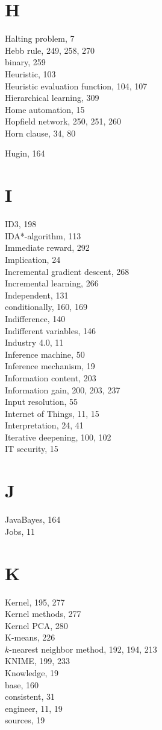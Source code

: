 \documentclass[10pt]{article}
\begin{document}
\section*{H}
Halting problem, 7\\
Hebb rule, 249, 258, 270\\
binary, 259\\
Heuristic, 103\\
Heuristic evaluation function, 104, 107\\
Hierarchical learning, 309\\
Home automation, 15\\
Hopfield network, 250, 251, 260\\
Horn clause, 34, 80

Hugin, 164

\section*{I}
ID3, 198\\
IDA*-algorithm, 113\\
Immediate reward, 292\\
Implication, 24\\
Incremental gradient descent, 268\\
Incremental learning, 266\\
Independent, 131\\
conditionally, 160, 169\\
Indifference, 140\\
Indifferent variables, 146\\
Industry 4.0, 11\\
Inference machine, 50\\
Inference mechanism, 19\\
Information content, 203\\
Information gain, 200, 203, 237\\
Input resolution, 55\\
Internet of Things, 11, 15\\
Interpretation, 24, 41\\
Iterative deepening, 100, 102\\
IT security, 15

\section*{J}
JavaBayes, 164\\
Jobs, 11

\section*{K}
Kernel, 195, 277\\
Kernel methods, 277\\
Kernel PCA, 280\\
K-means, 226\\
$k$-nearest neighbor method, 192, 194, 213\\
KNIME, 199, 233\\
Knowledge, 19\\
base, 160\\
consistent, 31\\
engineer, 11, 19\\
sources, 19
\end{document}
